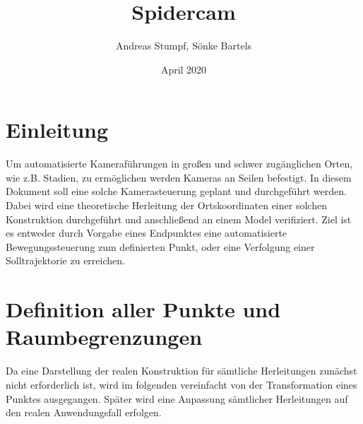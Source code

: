 \documentclass[12pt,titlepage]{article}
\title{Spidercam}
\date{April 2020}
\author{Andreas Stumpf, Sönke Bartels}
\begin{document}
	\maketitle
	\newpage	
	\linespread{2}
	\tableofcontents
	\vspace*{20mm}
	\listoffigures
	\pagebreak
	\section{Einleitung}
		Um automatisierte Kameraführungen in großen und schwer zugänglichen Orten, wie z.B. Stadien, zu ermöglichen werden Kameras an Seilen befestigt.
		In diesem Dokument soll eine solche Kamerasteuerung geplant und durchgeführt werden.
		Dabei wird eine theoretische Herleitung der Ortskoordinaten einer solchen Konstruktion durchgeführt und anschließend an einem Model verifiziert.
		Ziel ist es entweder durch Vorgabe eines Endpunktes eine automatisierte Bewegungssteuerung zum definierten Punkt, oder eine Verfolgung einer Solltrajektorie zu erreichen.
	\section{Definition aller Punkte und Raumbegrenzungen}
		Da eine Darstellung der realen Konstruktion für sämtliche Herleitungen zunächst nicht erforderlich ist, wird im folgenden vereinfacht von der Transformation eines Punktes ausgegangen. Später wird eine Anpassung sämtlicher Herleitungen auf den realen Anwendungsfall erfolgen.
		\pagebreak
\end{document}
